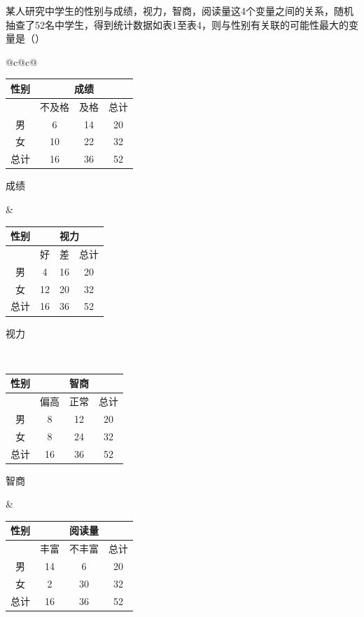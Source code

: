 \begin{problem}
某人研究中学生的性别与成绩，视力，智商，阅读量这4个变量之间的关系，随机抽查了52名中学生，得到统计数据如表1至表4，则与性别有关联的可能性最大的变量是（\quad）

\begin{center}
\setlength{\tabcolsep}{4pt}
\renewcommand{\arraystretch}{1.1}
\begin{tabular}{@{}c@{\hspace{1em}}c@{}}
\begin{minipage}[t]{0.46\linewidth}
\centering
\begin{tabular}{c|ccc}
\multicolumn{1}{c|}{性别} & \multicolumn{3}{c}{成绩} \\
\hline
 & 不及格 & 及格 & 总计 \\
\hline
男 & 6 & 14 & 20 \\
女 & 10 & 22 & 32 \\
总计 & 16 & 36 & 52 \\
\hline
\end{tabular}

成绩
\end{minipage}
&
\begin{minipage}[t]{0.46\linewidth}
\centering
\begin{tabular}{c|ccc}
\multicolumn{1}{c|}{性别} & \multicolumn{3}{c}{视力} \\
\hline
 & 好 & 差 & 总计 \\
\hline
男 & 4 & 16 & 20 \\
女 & 12 & 20 & 32 \\
总计 & 16 & 36 & 52 \\
\hline
\end{tabular}

视力
\end{minipage}
\\
\begin{minipage}[t]{0.46\linewidth}
\centering
\begin{tabular}{c|ccc}
\multicolumn{1}{c|}{性别} & \multicolumn{3}{c}{智商} \\
\hline
 & 偏高 & 正常 & 总计 \\
\hline
男 & 8 & 12 & 20 \\
女 & 8 & 24 & 32 \\
总计 & 16 & 36 & 52 \\
\hline
\end{tabular}

智商
\end{minipage}
&
\begin{minipage}[t]{0.46\linewidth}
\centering
\begin{tabular}{c|ccc}
\multicolumn{1}{c|}{性别} & \multicolumn{3}{c}{阅读量} \\
\hline
 & 丰富 & 不丰富 & 总计 \\
\hline
男 & 14 & 6 & 20 \\
女 & 2 & 30 & 32 \\
总计 & 16 & 36 & 52 \\
\hline
\end{tabular}


\end{minipage}
\end{tabular}
\end{center}
\end{problem}
